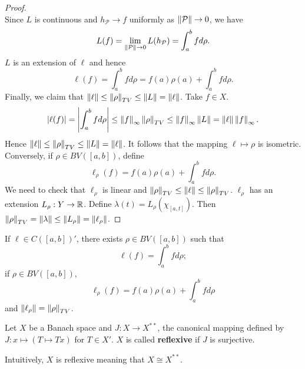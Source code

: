 \begin{proof}
\begin{equation*}
    \end{equation*}
    Since $L$ is continuous and $h_{\mathcal{P}}\to f$ uniformly as 
    $\left\lVert {\mathcal{P}} \right\rVert\to 0$, we have 
    \begin{equation*}
        L(f) = \lim_{\left\lVert {\mathcal{P}} \right\rVert\to 0} L(h_{\mathcal{P}}) 
        = \int_{a}^{b} fd\rho.
    \end{equation*} 
    $L$ is an extension of $\ell$ and hence  
    \begin{equation*}
        \ell(f) = \int_{a}^{b} fd\rho = f(a)\rho(a) + \int_{a}^{b} fd\rho.
    \end{equation*}
    Finally, we claim that $\left\lVert {\ell} \right\rVert\leq\left\lVert {\rho} \right\rVert_{TV}\leq\left\lVert {L} \right\rVert
    =\left\lVert {\ell} \right\rVert$. Take $f\in X$. 
    \begin{equation*}
        \left\lvert {\ell(f)} \right\rvert = \left\lvert {\int_{a}^{b} fd\rho} \right\rvert \leq \left\lVert {f} \right\rVert_{\infty}\left\lVert {\rho} \right\rVert_{TV} 
        \leq \left\lVert {f} \right\rVert_{\infty}\left\lVert {L} \right\rVert = \left\lVert {\ell} \right\rVert\left\lVert {f} \right\rVert_{\infty}.
    \end{equation*}
    Hence $\left\lVert {\ell} \right\rVert\leq\left\lVert {\rho} \right\rVert_{TV}\leq\left\lVert {L} \right\rVert = \left\lVert {\ell} \right\rVert$. 
    It follows that the mapping $\ell\mapsto\rho$ is isometric. Conversely, 
    if $\rho\in BV([a,b])$, define 
    \begin{equation*}
        \ell_{\rho}(f) = f(a)\rho(a) + \int_{a}^{b} fd\rho.
    \end{equation*} 
    We need to check that $\ell_{\rho}$ is linear and 
    $\left\lVert {\rho} \right\rVert_{TV}\leq\left\lVert {\ell} \right\rVert\leq\left\lVert {\rho} \right\rVert_{TV}$. $\ell_\rho$ 
    has an extension $L_\rho:Y\to\mathbb{R}$. Define 
    $\lambda(t) = L_\rho(\chi_{[a,t]})$. Then $\left\lVert {\rho} \right\rVert_{TV}=\left\lVert {\lambda} \right\rVert
    \leq\left\lVert {L_{\rho}} \right\rVert=\left\lVert {\ell_\rho} \right\rVert$.
\end{proof}
\begin{remark}
    If $\ell\in C([a,b])'$, there exists $\rho\in BV([a,b])$ such that 
    \begin{equation*}
        \ell(f) = \int_{a}^{b} fd\rho;
    \end{equation*}
    if $\rho\in BV([a,b])$, 
    \begin{equation*}
        \ell_{\rho}(f) = f(a)\rho(a) + \int_{a}^{b} fd\rho
    \end{equation*}
    and $\left\lVert {\ell_\rho} \right\rVert = \left\lVert {\rho} \right\rVert_{TV}$.
\end{remark}

\begin{definition}
    Let $X$ be a Banach space and $J:X\to X^{**}$, the canonical mapping 
    defined by $J:x\mapsto(T\mapsto Tx)$ for $T\in X'$. $X$ is called 
    \textbf{reflexive} if $J$ is surjective. 
\end{definition}
\begin{remark}
    Intuitively, $X$ is reflexive meaning that $X\cong X^{**}$. 
\end{remark}

